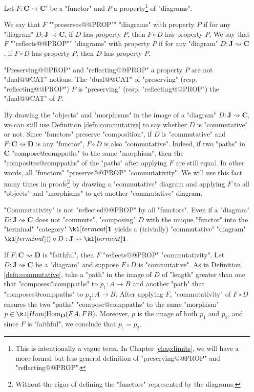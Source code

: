 \documentclass[main.tex]{subfiles}
\begin{document}
\begin{defn}\label{defn:presreflprop}
	Let $F: \mathbf{C} \rightsquigarrow \mathbf{C}'$ be a "functor" and $P$ a property\footnote{This is intentionally a vague term. In Chapter \ref{chap:limits}, we will have a more formal but less general definition of "preserving@@PROP" and "reflecting@@PROP".} of "diagrams".
	\begin{itemize}
		\itemAP[-] We say that $F$ ""preserves@@PROP"" "diagrams" with property $P$ if for any "diagram" $D: \mathbf{J} \rightsquigarrow \mathbf{C}$, if $D$ has property $P$, then $F \circ D$ has property $P$.
		\itemAP[-] We say that $F$ ""reflects@@PROP"" "diagrams" with property $P$ if for any "diagram" $D: \mathbf{J} \rightsquigarrow \mathbf{C}$, if $F \circ D$ has property $P$, then $D$ has property $P$.
	\end{itemize}
\end{defn}
\begin{warn}
	"Preserving@@PROP" and "reflecting@@PROP" a property $P$ are not "dual@@CAT" notions. The "dual@@CAT" of "preserving" (resp. "reflecting@@PROP") $P$ is "preserving" (resp. "reflecting@@PROP") the "dual@@CAT" of $P$. 
\end{warn}
\begin{exmp}["Commutativity"]
	By drawing the "objects" and "morphisms" in the image of a "diagram" $D: \mathbf{J} \rightsquigarrow \mathbf{C}$, we can still use Definition \ref{defn:commutative} to say whether $D$ is "commutative" or not. Since "functors" preserve "composition", if $D$ is "commutative" and $F: \mathbf{C} \rightsquigarrow \mathbf{D}$ is any "functor", $F\circ D$ is also "commutative". Indeed, if two "paths" in $\mathbf{C}$ "compose@comppaths" to the same "morphism", then the "composites@comppaths" of the "paths" after applying $F$ are still equal. In other words, all "functors" "preserve@@PROP" "commutativity". We will use this fact many times in proofs\footnote{Without the rigor of defining the "functors" represented by the diagrams.} by drawing a "commutative" diagram and applying $F$ to all "objects" and "morphisms" to get another "commutative" diagram.

	"Commutativity" is not "reflected@@PROP" by all "functors". Even if a "diagram" $D: \mathbf{J} \rightsquigarrow \mathbf{C}$ does not "commute", "composing" $D$ with the unique "functor" into the "terminal" "category" $\termcat$ yields a (trivially) "commutative" "diagram" $\termmorph \circ D : \mathbf{J} \rightsquigarrow \termcat$.

	If $F: \mathbf{C} \rightsquigarrow \mathbf{D}$ is "faithful", then $F$ "reflects@@PROP" "commutativity". Let $D: \mathbf{J} \rightsquigarrow \mathbf{C}$ be a "diagram" and suppose $F \circ D$ is "commutative". As in Definition \ref{defn:commutative}, take a "path" in the image of $D$ of "length" greater than one that "composes@comppaths" to $p_1: A \rightarrow B$ and another "path" that "composes@comppaths" to $p_2 : A \rightarrow B$. After applying $F$, "commutativity" of $F\circ D$ ensures the two "paths" "compose@comppaths" to the same "morphism" $p \in \Hom_{\mathbf{D}}(FA, FB)$. Moreover, $p$ is the image of both $p_1$ and $p_2$, and since $F$ is "faithful", we conclude that $p_1 = p_2$.
\end{exmp}
\end{document}
